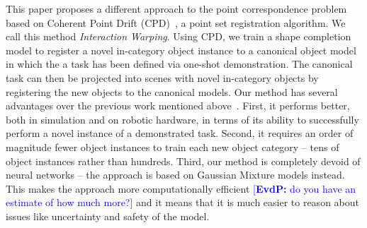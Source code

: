 \documentclass{article}
\newcommand{\evdp}[1]{\textcolor{blue}{[\textbf{EvdP:} #1]}}
\begin{document}




This paper proposes a different approach to the point correspondence problem based on Coherent Point Drift (CPD)~\cite{myronenko2010point}, a point set registration algorithm. We call this method \emph{Interaction Warping}. Using CPD, we train a shape completion model to register a novel in-category object instance to a canonical object model in which the a task has been defined via one-shot demonstration. The canonical task can then be projected into scenes with novel in-category objects by registering the new objects to the canonical models. Our method has several advantages over the previous work mentioned above~\cite{pan2022tax,wang2019dynamic,manuelli2019kpam}. First, it performs better, both in simulation and on robotic hardware, in terms of its ability to successfully perform a novel instance of a demonstrated task. Second, it requires an order of magnitude fewer object instances to train each new object category -- tens of object instances rather than hundreds. Third, our method is completely devoid of neural networks -- the approach is based on Gaussian Mixture models instead. This makes the approach more computationally efficient \evdp{do you have an estimate of how much more?} and it means that it is much easier to reason about issues like uncertainty and safety of the model. 
\end{document}
